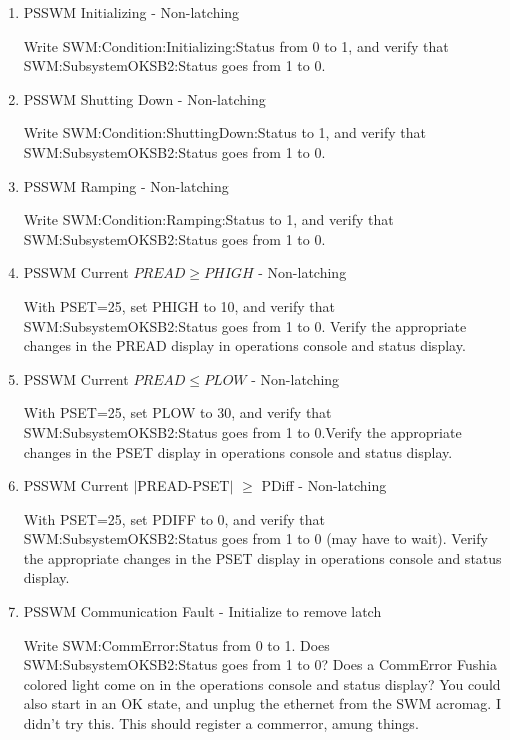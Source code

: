 \documentclass[11pt]{book}		%
\begin{document}
\begin{enumerate}
 \item PSSWM Initializing - Non-latching

\color{red}
Write SWM:Condition:Initializing:Status from 0 to 1, and verify that SWM:SubsystemOKSB2:Status goes from 1 to 0.

\color{black}

 \item PSSWM Shutting Down - Non-latching

\color{red}
Write SWM:Condition:ShuttingDown:Status to 1, and verify that SWM:SubsystemOKSB2:Status goes from 1 to 0.
\color{black}

 \item PSSWM Ramping - Non-latching

\color{red}
Write SWM:Condition:Ramping:Status to 1, and verify that SWM:SubsystemOKSB2:Status goes from 1 to 0.
\color{black}


 \item PSSWM Current $PREAD \geq PHIGH$ - Non-latching

\color{red}
With PSET=25, set PHIGH to 10, and verify that SWM:SubsystemOKSB2:Status goes from 1 to 0. Verify the appropriate changes in the PREAD display in operations console and status display.
\color{black}

 \item PSSWM Current $PREAD \leq PLOW$ - Non-latching

\color{red}
With PSET=25, set PLOW to 30, and verify that SWM:SubsystemOKSB2:Status goes from 1 to 0.Verify the appropriate changes in the PSET display in operations console and status display.
\color{black}

 \item PSSWM Current $\mid$PREAD-PSET$\mid$  $\geq$ PDiff - Non-latching

\color{red}
With PSET=25, set PDIFF to 0, and verify that SWM:SubsystemOKSB2:Status goes from 1 to 0 (may have to wait). Verify the appropriate changes in the PSET display in operations console and status display.
\color{black}

 \item PSSWM Communication Fault - Initialize to remove latch

\color{red}
Write SWM:CommError:Status from 0 to 1. Does SWM:SubsystemOKSB2:Status goes from 1 to 0? Does a CommError Fushia colored light come on in the operations console and status display? You could also start in an OK state, and unplug the ethernet from the SWM acromag. I didn't try this. This should register a commerror, amung things.
\color{black}



\end{enumerate}
\end{document}
